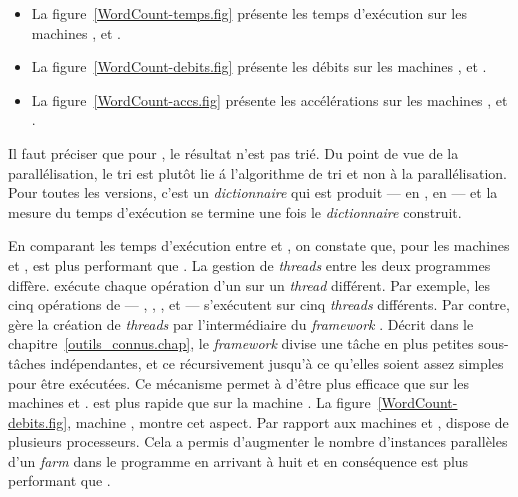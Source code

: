 \begin{itemize}

\item La figure~\ref{WordCount-temps.fig} pr\'esente les temps
d'ex\'ecution sur les machines ,  et .

\item La figure~\ref{WordCount-debits.fig} pr\'esente les débits sur
les machines ,  et .

\item La figure~\ref{WordCount-accs.fig} pr\'esente les accélérations
sur les machines ,  et .
\end{itemize}


Il faut pr\'eciser que pour , le r\'esultat n'est pas tri\'e. Du point de vue de la parall\'elisation, le tri est plut\^ot lie \'a l'algorithme de tri et non \`a la parall\'elisation. Pour toutes les versions, c'est un \emph{dictionnaire} qui est produit ---  en ,  en  --- et la mesure du temps d'exécution se termine une fois le \emph{dictionnaire} construit.

En comparant les temps d'ex\'ecution entre  et , on constate que, pour les machines  et ,  est plus performant que . La gestion de \emph{threads} entre les deux programmes diff\`ere.  ex\'ecute chaque op\'eration d'un  sur un \emph{thread} diff\'erent. Par exemple, les cinq op\'erations de  --- , , ,  et  --- s'ex\'ecutent sur cinq \emph{threads} diff\'erents. Par contre,  g\`ere la cr\'eation de \emph{threads} par l'interm\'ediaire du \emph{framework} . D\'ecrit dans le chapitre~\ref{outils_connus.chap}, le \emph{framework} divise une t\^ache en plus petites sous-t\^aches ind\'ependantes, et ce r\'ecursivement jusqu'\`a ce qu'elles soient assez simples pour \^etre ex\'ecut\'ees. Ce m\'ecanisme permet \`a  d'\^etre plus efficace que  sur les machines  et .  est plus rapide que  sur la machine . La figure~\ref{WordCount-debits.fig}, machine , montre cet aspect. Par rapport aux machines  et ,  dispose de plusieurs processeurs. Cela a permis d'augmenter le nombre d'instances parall\`eles d'un \emph{farm} dans le programme  en arrivant \`a huit et en cons\'equence  est plus performant que . 


